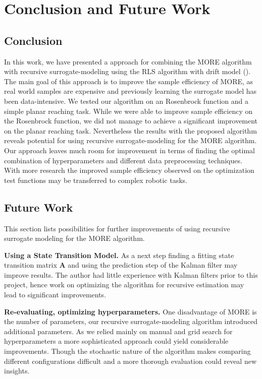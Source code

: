
\chapter{Conclusion and Future Work}


\section{Conclusion}
In this work, we have presented a approach for combining the MORE algorithm
\citep{abdolmaleki2015model} with recursive surrogate-modeling
using the RLS algorithm with drift model ().
The main goal of this approach is to improve the sample efficiency of
MORE, as real world samples are expensive and
previously learning the surrogate model has been data-intensive.
We tested our algorithm on an Rosenbrock function and
a simple planar reaching task.
While we were able to improve sample efficiency on the Rosenbrock
function, we did not manage to achieve a
significant improvement on the planar reaching task.
Nevertheless the results with the proposed algorithm reveals potential for
using recursive surrogate-modeling for the MORE algorithm.
Our approach leaves much room for improvement in terms of finding
the optimal combination of hyperparameters and different data
preprocessing techniques.
With more research the improved sample efficiency observed
on the optimization test functions may be transferred to
complex robotic tasks.

\section{Future Work}
This section lists possibilities for further improvements of using
recursive surrogate modeling for the MORE algorithm.

\textbf{Using a State Transition Model.}
As a next step finding a fitting state transition matrix $\mathbf{A}$ and
using the prediction step of the Kalman filter may improve results. 
The author had little experience with Kalman filters prior
to this project, hence work on optimizing the algorithm for
recursive estimation may lead to significant improvements.

\textbf{Re-evaluating, optimizing hyperparameters.}
One disadvantage of MORE is the number of parameters, our
recursive surrogate-modeling algorithm introduced additional parameters.
As we relied mainly on manual and grid search for hyperparameters a
more sophisticated approach could yield considerable improvements.
Though the stochastic nature of the algorithm makes comparing
different configurations difficult and a more thorough evaluation
could reveal new insights.

